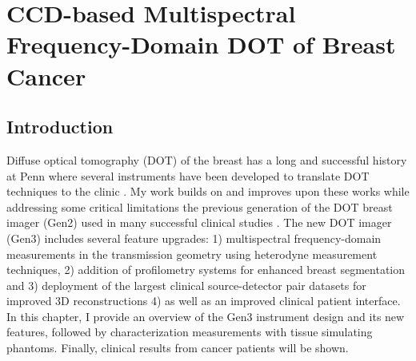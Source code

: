 \chapter{CCD-based Multispectral Frequency-Domain DOT of Breast Cancer}
\section{Introduction}
Diffuse optical tomography (DOT) of the breast has a long and successful history at Penn where several instruments have been developed to translate DOT techniques to the clinic \cite{corlu_03_1,culver_03_3,Holboke2000,Ntziachristos1999,Ntziachristos2001,Ntziachristos2000,Ntziachristos2002,OLeary1996,Zhu1999}. My work builds on and improves upon these works while addressing some critical limitations the previous generation of the DOT breast imager (Gen2) used in many successful clinical studies \cite{choe_05_1,choe_09_1,corlu_07_1,corlu_03_1,corlu_05_1,culver_03_1}. The new DOT imager (Gen3) includes several feature upgrades: 1) multispectral frequency-domain measurements in the transmission geometry using heterodyne measurement techniques, 2) addition of profilometry systems for enhanced breast segmentation and 3) deployment of the largest clinical source-detector pair datasets for improved 3D reconstructions 4) as well as an improved clinical patient interface. In this chapter, I provide an overview of the Gen3 instrument design and its new features, followed by characterization measurements with tissue simulating phantoms. Finally, clinical results from cancer patients will be shown.

